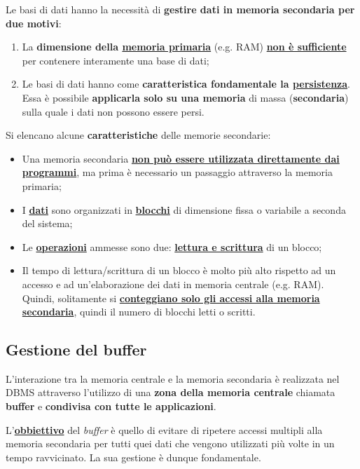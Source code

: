 \documentclass[a4paper]{article}
\begin{document}
	Le basi di dati hanno la necessità di \textbf{gestire dati in memoria secondaria per due motivi}:
	\begin{enumerate}
		\item La \textbf{dimensione della \underline{memoria primaria}} (e.g. RAM) \textbf{\underline{non è sufficiente}} per contenere interamente una base di dati;
		
		\item Le basi di dati hanno come \textbf{caratteristica fondamentale la \underline{persistenza}}. Essa è possibile \textbf{applicarla solo su una memoria} di massa (\textbf{secondaria}) sulla quale i dati non possono essere persi.
	\end{enumerate}
	Si elencano alcune \textbf{caratteristiche} delle memorie secondarie:
	\begin{itemize}
		\item Una memoria secondaria \textbf{\underline{non può essere utilizzata direttamente dai}} \textbf{\underline{programmi}}, ma prima è necessario un passaggio attraverso la memoria primaria;
		
		\item I \textbf{\underline{dati}} sono organizzati in \textbf{\underline{blocchi}} di dimensione fissa o variabile a seconda del sistema;
		
		\item Le \textbf{\underline{operazioni}} ammesse sono due: \textbf{\underline{lettura e scrittura}} di un blocco;
		
		\item Il tempo di lettura/scrittura di un blocco è molto più alto rispetto ad un accesso e ad un'elaborazione dei dati in memoria centrale (e.g. RAM). Quindi, solitamente si \textbf{\underline{conteggiano solo gli accessi alla memoria secondaria}}, quindi il numero di blocchi letti o scritti.
	\end{itemize}\newpage
	
	\subsection{Gestione del buffer}
	
	L'interazione tra la memoria centrale e la memoria secondaria è realizzata nel DBMS attraverso l'utilizzo di una \textbf{zona della memoria centrale} chiamata \textcolor{Red3}{\textbf{buffer}} e \textbf{condivisa con tutte le applicazioni}.\newline
	
	\noindent
	L'\underline{\textbf{obbiettivo}} del \emph{buffer} è quello di evitare di ripetere accessi multipli alla memoria secondaria per tutti quei dati che vengono utilizzati più volte in un tempo ravvicinato. La sua gestione è dunque fondamentale.\newline
	
\end{document}
